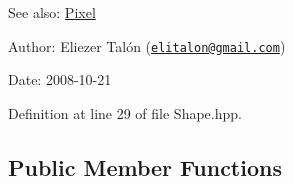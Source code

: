 \begin{Desc}
\item[See also:]\hyperlink{_pixel_8hpp_535e59456e3e633842529cfa8ea103c4}{Pixel}\end{Desc}
\begin{Desc}
\item[Author:]Eliezer Talón (\href{mailto:elitalon@gmail.com}{\tt elitalon@gmail.com}) \end{Desc}
\begin{Desc}
\item[Date:]2008-10-21 \end{Desc}


Definition at line 29 of file Shape.hpp.\subsection*{Public Member Functions}
